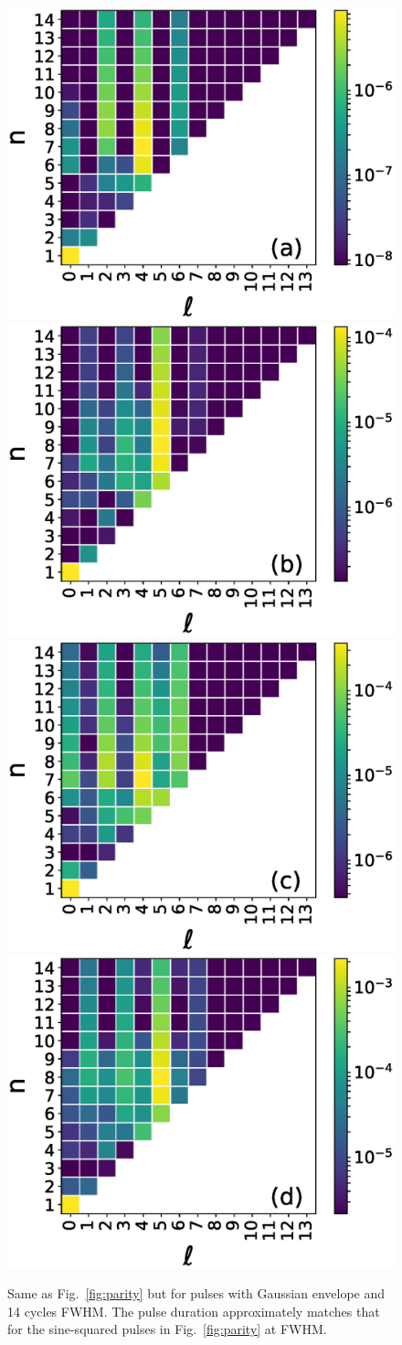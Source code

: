 \begin{figure}[!ht]
\centering
\includegraphics[width=0.49\columnwidth]{figs/Rydberg/heat_14_cyc_gauss_3p4e13.eps}
\includegraphics[width=0.49\columnwidth]{figs/Rydberg/heat_14_cyc_gauss_6p0e13.eps}
\includegraphics[width=0.49\columnwidth]{figs/Rydberg/heat_14_cyc_gauss_8p6e13.eps}
\includegraphics[width=0.49\columnwidth]{figs/Rydberg/heat_14_cyc_gauss_11p2e13.eps}
\caption{\label{fig:parity_gauss}
Same as Fig.~\ref{fig:parity} but for pulses with Gaussian envelope and 14 cycles FWHM. The pulse duration approximately matches that for the sine-squared pulses in Fig.~\ref{fig:parity} at FWHM.
}
\end{figure}

